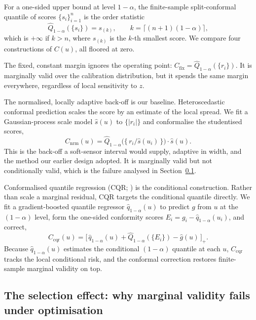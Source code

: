 For a one-sided upper bound at level $1-\alpha$, the finite-sample split-conformal quantile
of scores $\{s_i\}_{i=1}^n$ is the order statistic
\begin{equation}
\widehat Q_{1-\alpha}(\{s_i\}) = s_{(k)},\qquad
k=\big\lceil (n+1)(1-\alpha)\big\rceil ,
\label{eq:quantile}
\end{equation}
which is $+\infty$ if $k>n$, where $s_{(k)}$ is the $k$-th smallest score. We compare four
constructions of $C(u)$, all floored at zero.

The fixed, constant margin ignores the operating point:
$C_{\mathrm{fix}}=\widehat Q_{1-\alpha}(\{r_i\})$. It is marginally valid over the
calibration distribution, but it spends the same margin everywhere, regardless of local
sensitivity to $z$.

The normalised, locally adaptive back-off is our baseline. Heteroscedastic conformal
prediction \citep{lei2018} scales the score by an estimate of the local spread. We fit a
Gaussian-process scale model $\hat s(u)$ to $\{|r_i|\}$ and conformalise the studentised
scores,
\begin{equation*}
C_{\mathrm{nrm}}(u) = \widehat Q_{1-\alpha}\!\big(\{\,r_i/\hat s(u_i)\,\}\big)\cdot\hat s(u).
\end{equation*}
This is the back-off a soft-sensor interval would supply, adaptive in width, and the method
our earlier design adopted. It is marginally valid but not conditionally valid, which is the
failure analysed in Section~\ref{sec:methods-selection}.

Conformalised quantile regression (CQR; \citealt{romano2019}) is the conditional
construction. Rather than scale a marginal residual, CQR targets the conditional quantile
directly. We fit a gradient-boosted quantile regressor $\hat q_{1-\alpha}(u)$ to predict $g$
from $u$ at the $(1-\alpha)$ level, form the one-sided conformity scores
$E_i=g_i-\hat q_{1-\alpha}(u_i)$, and correct,
\begin{equation*}
C_{\mathrm{cqr}}(u) = \big[\,\hat q_{1-\alpha}(u) + \widehat Q_{1-\alpha}(\{E_i\}) - \hat g(u)\,\big]_+ .
\end{equation*}
Because $\hat q_{1-\alpha}(u)$ estimates the conditional $(1-\alpha)$ quantile at each $u$,
$C_{\mathrm{cqr}}$ tracks the local conditional risk, and the conformal correction restores
finite-sample marginal validity on top.

\subsection{The selection effect: why marginal validity fails under optimisation}
\label{sec:methods-selection}

